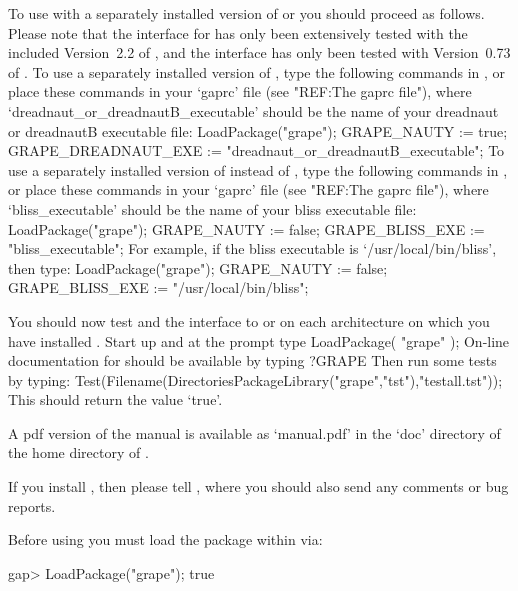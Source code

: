 To use {\GRAPE} with a separately installed version of {\nauty} or
{\bliss} you should proceed as follows. Please note that the {\nauty}
interface for {\GRAPE} has only been extensively tested with the
included Version~2.2 of {\nauty}, and the {\bliss} interface has only
been tested with Version~0.73 of {\bliss}. To use a separately
installed version of {\nauty}, type the following commands in {\GAP}, or 
place these commands in your `gaprc' file (see "REF:The gaprc file"), where
`dreadnaut_or_dreadnautB_executable' should be the name of your
dreadnaut or dreadnautB executable file:
\begintt
LoadPackage("grape"); 
GRAPE_NAUTY := true; 
GRAPE_DREADNAUT_EXE := "dreadnaut_or_dreadnautB_executable"; 
\endtt 
To use a separately installed version of {\bliss} instead of {\nauty},
type the following commands in {\GAP}, or place these commands in your
`gaprc' file (see "REF:The gaprc file"), where `bliss_executable' should be
the name of your bliss executable file:
\begintt
LoadPackage("grape"); 
GRAPE_NAUTY := false; 
GRAPE_BLISS_EXE := "bliss_executable"; 
\endtt 
For example, if the bliss executable is `/usr/local/bin/bliss', then type:
\begintt
LoadPackage("grape"); 
GRAPE_NAUTY := false; 
GRAPE_BLISS_EXE := "/usr/local/bin/bliss"; 
\endtt 

You should now test {\GRAPE} and the interface to {\nauty} or {\bliss}
on each architecture on which you have installed {\GRAPE}. Start up
{\GAP} and at the prompt type 
\begintt 
LoadPackage( "grape" ); 
\endtt
On-line documentation for {\GRAPE} should be available by typing 
\begintt
?GRAPE 
\endtt 
Then run some tests by typing:
\begintt
Test(Filename(DirectoriesPackageLibrary("grape","tst"),"testall.tst"));
\endtt
This should return the value `true'.
	
A pdf version of the {\GRAPE} manual is available as `manual.pdf' in the
`doc' directory of the home directory of {\GRAPE}.

If you install {\GRAPE}, then please tell ,
where you should also send any comments or bug reports.


Before using {\GRAPE} you must load the package within {\GAP} via: 

\begintt
gap> LoadPackage("grape");
true
\endtt

 
